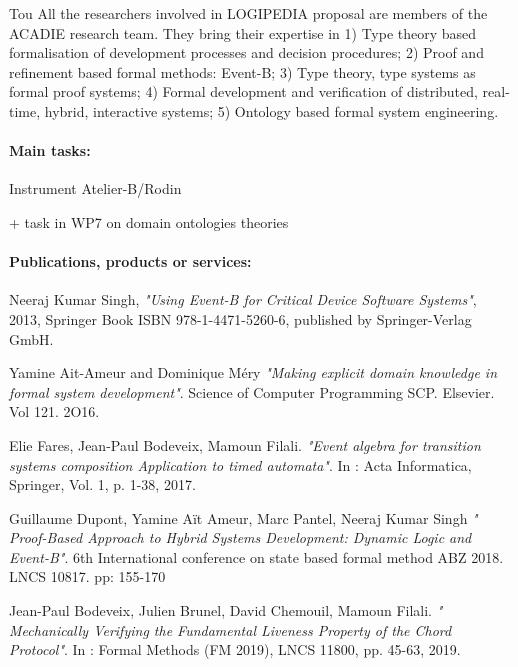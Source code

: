 \begin{sitedescription}{Tou}
 All the researchers involved in LOGIPEDIA proposal are members of the ACADIE research team. They bring their expertise in 1) Type theory based formalisation of development processes and decision procedures; 2) Proof and refinement based formal methods: Event-B; 3) Type theory, type systems as formal proof systems; 4) Formal development and verification of distributed, real-time, hybrid, interactive systems; 5)  Ontology based formal system engineering.


\paragraph*{Main tasks:}

\begin{compactitem}
\item {} Instrument Atelier-B/Rodin
\item {\color{red} + task in WP7 on domain ontologies theories}
\end{compactitem}

\paragraph*{Publications, products or services:}

\begin{compactitem}
\item Neeraj Kumar Singh, {\it "Using Event-B for Critical Device Software Systems"}, 2013, Springer Book ISBN 978-1-4471-5260-6, published by Springer-Verlag GmbH.
\item Yamine Ait-Ameur and Dominique M\'ery {\it "Making explicit domain knowledge in formal system development"}. Science of Computer Programming SCP. Elsevier. Vol 121.  2O16.
\item Elie Fares, Jean-Paul Bodeveix, Mamoun Filali. {\it "Event algebra for transition systems composition Application to timed automata"}. In : Acta Informatica, Springer, Vol. 1, p. 1-38,  2017. 
\item 	Guillaume Dupont, Yamine Aït Ameur, Marc Pantel, Neeraj Kumar Singh {\it " 
Proof-Based Approach to Hybrid Systems Development: Dynamic Logic and Event-B"}. 6th International conference on state based formal method ABZ 2018. LNCS 10817. pp: 155-170
\item Jean-Paul Bodeveix, Julien Brunel, David Chemouil, Mamoun Filali. {\it " Mechanically Verifying the Fundamental Liveness Property of the Chord Protocol"}. In : Formal Methods (FM 2019), LNCS  11800, pp. 45-63, 2019.
\end{compactitem}


\end{sitedescription}

